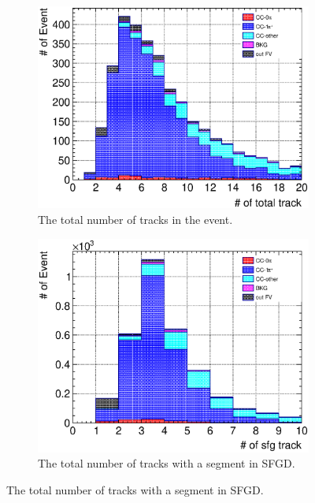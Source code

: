 \begin{figure}
  \centering
  \begin{subfigure}{\dbfigwid\textwidth}
       \includegraphics[width=\textwidth]{figures/sel/TPCmu_ntotaltrk_stack_al8.eps}
       \caption{The total number of tracks in the event.}
       \label{subfig:tlpi-trknum-tot}
  \end{subfigure}
  \begin{subfigure}{\dbfigwid\textwidth}
       \includegraphics[width=\textwidth]{figures/sel/TPCmu_nsfgtrk_stack_al8.eps}
       \caption{The total number of tracks with a segment in SFGD.}
       \label{subfig:tlpi-trknum-sfgd}
  \end{subfigure}

\end{figure}
